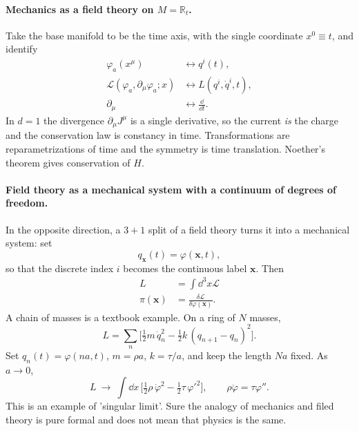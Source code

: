 \paragraph{Mechanics as a field theory on $M=\mathbb R_t$.}
Take the base manifold to be the time axis, with the single coordinate
$x^0\equiv t$, and identify
\begin{equation}
    \label{dictionary-id}
    \begin{split}
        \varphi_a(x^\mu)&\leftrightarrow q^i(t),\\
        \mathcal L(\varphi_a,\partial_\mu\varphi_a;x)&\leftrightarrow L(q^i,\dot q^i,t),\\
        \partial_\mu &\leftrightarrow \frac{\dd}{\dd t}.
    \end{split}
\end{equation}
In $d=1$ the divergence $\partial_\mu J^\mu$ is a single derivative, so the
current \emph{is} the charge and the conservation law is constancy in time.
Transformations are reparametrizations of time and the symmetry is time 
translation. Noether's theorem gives conservation of $H$. 

\paragraph{Field theory as a mechanical system with a continuum of degrees of
freedom.}
In the opposite direction, a $3{+}1$ split of a field theory turns it into a
mechanical system: set 
\[q_{\bm{x}}(t)=\varphi(\bm{x},t),\]
so that the discrete index
$i$ becomes the continuous label $\bm{x}$. Then
\begin{equation*}
    \begin{split}
        L&=\int\dd^3 x \mathcal{L} \\
        \pi(\bm{x})&=\frac{\delta \mathcal{L}}{\delta\dot\varphi(\bm{x})}.
    \end{split}
\end{equation*}
A chain of masses is a textbook example. On a ring of $N$
masses,
\begin{equation*}
  L=\sum_{n}\Big[\tfrac12m\,\dot q_n^2-\tfrac12k\,(q_{n+1}-q_n)^2\Big].
\end{equation*}
Set $q_n(t)=\varphi(na,t)$, $m=\rho a$, $k=\tau/a$, and keep the length $Na$
fixed. As $a\to0$,
\begin{equation*}
  L\ \to\ \int\dd x\,\Big[\tfrac12\rho\,\dot\varphi^2-\tfrac12\tau\,\varphi'^2\Big],
  \qquad\rho\ddot\varphi=\tau\varphi'' .
\end{equation*}
This is an example of 'singular limit'. Sure the analogy of mechanics and
filed theory is pure formal and does not mean that physics is the same.

